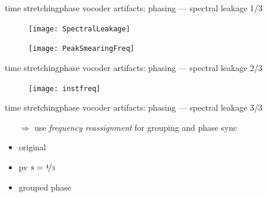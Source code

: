     \begin{frame}{time stretching}{phase vocoder artifacts: phasing --- spectral leakage 1/3}
        \vspace{-3mm}
            \begin{figure}
                \centering
                \texttt{[image: SpectralLeakage]}
            \end{figure}
            \begin{figure}
                \centerline{\texttt{[image: PeakSmearingFreq]}}
            \end{figure}
    \end{frame}
	\begin{frame}{time stretching}{phase vocoder artifacts: phasing --- spectral leakage 2/3}
			\begin{figure}
				\centerline{\texttt{[image: instfreq]}}
			\end{figure}
    \end{frame}
	\begin{frame}{time stretching}{phase vocoder artifacts: phasing --- spectral leakage 3/3}
                \begin{itemize}
                    \item[$\Rightarrow$] use \textit{frequency reassignment} for grouping and phase sync
                \end{itemize}
                \bigskip
                        \begin{itemize}
                            \item   original  
                            \item   pv $s = \nicefrac{4}{3}$ 
                            \item   grouped phase 
                        \end{itemize}
    \end{frame}
